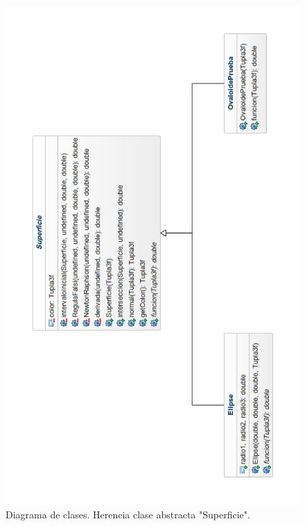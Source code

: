 \begin{figure}[h]
	\begin{center}
		\includegraphics[width=1.0\textwidth]{imagenes/diagrama-clases-superficie.png}
	\end{center}
	\caption{Diagrama de clases. Herencia clase abstracta "Superficie".}
	\label{fig:etiq_32}
\end{figure}

